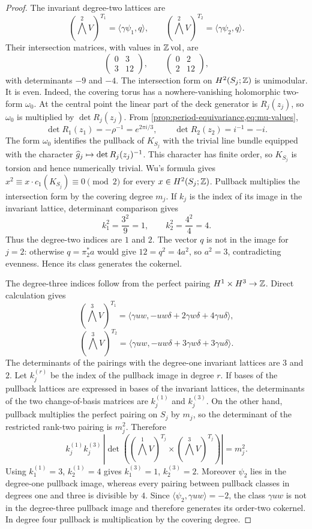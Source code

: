 \begin{proof}
The invariant degree-two lattices are
\[
 (\textstyle\bigwedge^2V)^{T_1}=\langle\gamma\psi_1,q\rangle,
 \qquad
 (\textstyle\bigwedge^2V)^{T_2}=\langle\gamma\psi_2,q\rangle.
\]
Their intersection matrices, with values in $\mathbb Z\operatorname{vol}$, are
\[
 \begin{pmatrix}0&3\\3&12\end{pmatrix},
 \qquad
 \begin{pmatrix}0&2\\2&12\end{pmatrix},
\]
with determinants $-9$ and $-4$.  The intersection form on
$H^2(S_j;\mathbb Z)$ is unimodular.  It is even.  Indeed, the covering torus has
a nowhere-vanishing holomorphic two-form $\omega_0$.  At the central
point the linear part of the deck generator is $R_j(z_j)$, so
$\omega_0$ is multiplied by $\det R_j(z_j)$.  From
\cref{prop:period-equivariance,eq:mu-values},
\[
 \det R_1(z_1)=-\rho^{-1}=e^{2\pi i/3},
 \qquad
 \det R_2(z_2)=i^{-1}=-i.
\]
The form $\omega_0$ identifies the pullback of $K_{S_j}$ with the
trivial line bundle equipped with the character
$\widehat g_j\mapsto\det R_j(z_j)^{-1}$.  This character has finite order, so
$K_{S_j}$ is torsion and hence numerically trivial.  Wu's formula gives
$x^2\equiv x\cdot c_1(K_{S_j})\equiv0\pmod2$ for every
$x\in H^2(S_j;\mathbb Z)$.  Pullback multiplies the intersection form by the
covering degree $m_j$.
If $k_j$ is the index of its image in the invariant lattice, determinant
comparison gives
\[
 k_1^2=\frac{3^2}{9}=1,
 \qquad
 k_2^2=\frac{4^2}{4}=4.
\]
Thus the degree-two indices are $1$ and $2$.  The vector $q$ is not in the
image for $j=2$: otherwise $q=\pi_2^*a$ would give
$12=q^2=4a^2$, so $a^2=3$, contradicting evenness.  Hence its class
generates the cokernel.

The degree-three indices follow from the perfect pairing
$H^1\times H^3\to\mathbb Z$.  Direct calculation gives
\[
 (\textstyle\bigwedge^3V)^{T_1}
 =\langle\gamma uw,-uw\delta+2\gamma w\delta+4\gamma u\delta\rangle,
\]
\[
 (\textstyle\bigwedge^3V)^{T_2}
 =\langle\gamma uw,-uw\delta+3\gamma w\delta+3\gamma u\delta\rangle.
\]
The determinants of the pairings with the degree-one invariant lattices
are $3$ and $2$.  Let $k_j^{(r)}$ be the index of the pullback image in
degree $r$.  If bases of the pullback lattices are expressed in bases of
the invariant lattices, the determinants of the two change-of-basis
matrices are $k_j^{(1)}$ and $k_j^{(3)}$.  On the other hand, pullback
multiplies the perfect pairing on $S_j$ by $m_j$, so the determinant of
the restricted rank-two pairing is $m_j^2$.  Therefore
\[
 k_j^{(1)}k_j^{(3)}
 \,|\det( (\textstyle\bigwedge^1V)^{T_j}
            \times(\textstyle\bigwedge^3V)^{T_j})|
 =m_j^2.
\]
Using $k_1^{(1)}=3$, $k_2^{(1)}=4$ gives
$k_1^{(3)}=1$, $k_2^{(3)}=2$.  Moreover $\psi_2$ lies in the degree-one
pullback image, whereas every pairing between pullback classes in degrees
one and three is divisible by $4$.  Since
$\langle\psi_2,\gamma uw\rangle=-2$, the class $\gamma uw$ is not in
the degree-three pullback image and therefore generates its order-two
cokernel.  In degree four pullback is multiplication by the covering
degree.
\end{proof}

